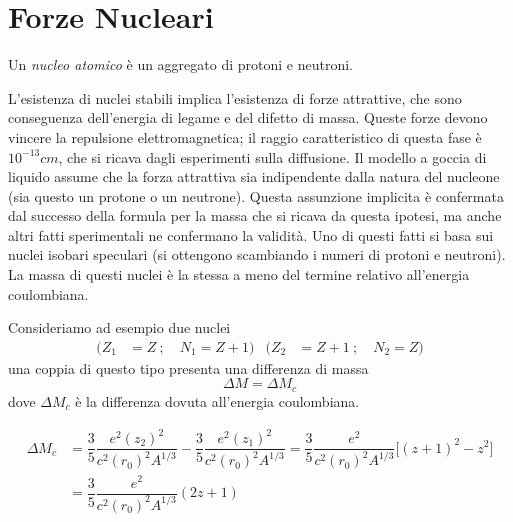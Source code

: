 \chapter{Forze Nucleari}

Un   \textit{nucleo atomico} è un aggregato di protoni e neutroni.

L'esistenza di nuclei stabili implica l'esistenza di forze attrattive, che sono
conseguenza  dell'energia di legame e del difetto di massa. Queste forze devono
vincere la repulsione elettromagnetica; il raggio caratteristico di questa fase
è $10^{-13} cm$, che si ricava dagli esperimenti sulla diffusione. Il modello a
goccia di liquido assume che la forza attrattiva sia indipendente dalla natura
del nucleone (sia questo un protone o un neutrone). Questa assunzione implicita
è confermata dal successo della formula per la massa che si ricava da questa
ipotesi, ma anche altri fatti sperimentali ne confermano la validità. Uno di
questi fatti si basa sui nuclei isobari speculari (si ottengono scambiando i
numeri di protoni e neutroni). La massa di questi nuclei è la stessa a meno del
termine relativo all'energia coulombiana. 

Consideriamo ad esempio due nuclei
\begin{align*}
	( Z_{1}& = Z \ ;  \quad N_{1} = Z+1 ) &  ( Z_{2}& = Z+1 \ ;  \quad N_{2} = Z) 
\end{align*}
una coppia di questo tipo presenta una differenza di massa 
\begin{equation*}
	 \Delta M = \Delta M_{c} 
\end{equation*}
dove $\Delta M_{c}$ è la differenza dovuta all'energia coulombiana.

\begin{equation}
\begin{split}
	\Delta M_{c} &= \dfrac{3}{5} \dfrac{e^2 (z_{2})^2}{c^2(r_{0})^2 A^{1/3}} - \dfrac{3}{5} \dfrac{e^2 				(z_{1})^2}{c^2(r_{0})^2 A^{1/3}} = \dfrac{3}{5} \dfrac{e^2}{c^2(r_{0})^2 A^{1/3}} 				\bigl[ (z+1)^2-z^2 \bigr ] \\
			&= \dfrac{3}{5} \dfrac{e^2}{c^2(r_{0})^2 A^{1/3}} (2z+1)
\end{split}
\end{equation}

